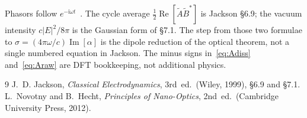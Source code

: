 \documentclass[11pt,a4paper]{article}
\newcommand{\om}{\omega}
\newcommand{\re}[1]{\operatorname{Re}[#1]}
\newcommand{\im}[1]{\operatorname{Im}[#1]}
\begin{document}
\noindent
Phasors follow $e^{-\mathrm{i}\om t}$~\cite{jackson1999}.
The cycle average $\tfrac12\re{\tilde A\tilde B^{\ast}}$ is Jackson \S6.9; the vacuum intensity $c\lvert E\rvert^{2}/8\pi$ is the Gaussian form of \S7.1.
The step from those two formulae to $\sigma=(4\pi\om/c)\im{\alpha}$ is the dipole reduction of the optical theorem, not a single numbered equation in Jackson.
The minus signs in~\eqref{eq:Adiss} and~\eqref{eq:Araw} are DFT bookkeeping, not additional physics.\\

\begin{thebibliography}{9}
J.~D. Jackson, \emph{Classical Electrodynamics}, 3rd~ed.\ (Wiley, 1999), \S6.9 and \S7.1.
L.~Novotny and B.~Hecht, \emph{Principles of Nano-Optics}, 2nd~ed.\ (Cambridge University Press, 2012).
\end{thebibliography}
\end{document}
